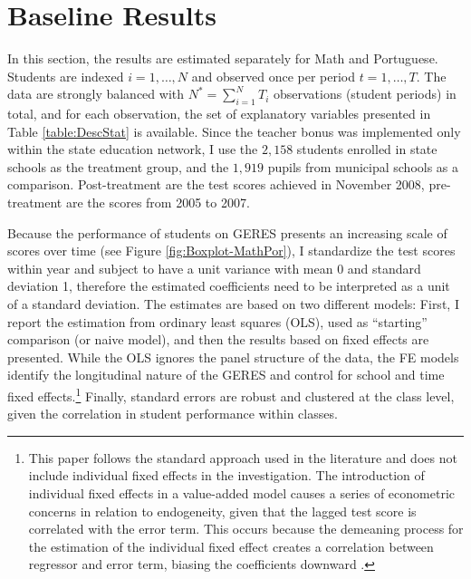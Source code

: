 \documentclass[a4paper, 12pt]{article}
\begin{document}
\section{Baseline Results} \label{Paper3-Results}


In this section, the results are estimated separately for Math and Portuguese. Students are indexed $i=1, \dotsc, N$ and observed once per period $t=1, \dotsc, T$. The data are strongly balanced with $N^*=\sum_{i=1}^N T_i$ observations (student periods) in total, and for each observation, the set of explanatory variables presented in Table \ref{table:DescStat} is available. Since the teacher bonus was implemented only within the state education network, I use the $2,158$ students enrolled in state schools as the treatment group, and the $1,919$ pupils from municipal schools as a comparison. Post-treatment are the test scores achieved in November 2008, pre-treatment are the scores from 2005 to 2007.

Because the performance of students on GERES presents an increasing scale of scores over time (see Figure \ref{fig:Boxplot-MathPor}), I standardize the test scores within year and subject to have a unit variance with mean 0 and standard deviation 1, therefore the estimated coefficients need to be interpreted as a unit of a standard deviation. The estimates are based on two different models: First, I report the estimation from ordinary least squares (OLS), used as “starting” comparison (or naive model), and then the results based on fixed effects are presented. While the OLS ignores the panel structure of the data, the FE models identify the longitudinal nature of the GERES and control for school and time fixed effects.\footnote{This paper follows the standard approach used in the literature \citep[see e.g.][]{loyalka2019pay,barrera2017teacher, britton2016teacher, imberman2015incentive} and does not include individual fixed effects in the investigation. The introduction of individual fixed effects in a value-added model causes a series of econometric concerns in relation to endogeneity, given that the lagged test score is correlated with the error term. This occurs because the demeaning process for the estimation of the individual fixed effect creates a correlation between regressor and error term, biasing the coefficients downward \citep{nickell1981biases}.} Finally, standard errors are robust and clustered at the class level, given the correlation in student performance within classes. 
\end{document}
